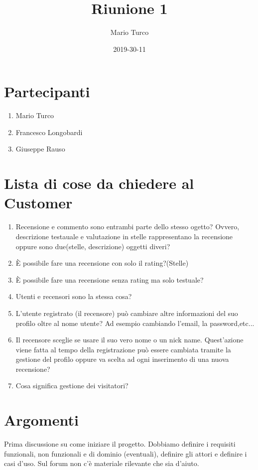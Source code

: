\documentclass{article}
\title{Riunione 1}
\date{2019-30-11}
\author{Mario Turco}
\begin{document}
\maketitle
{}
\newpage
{}
\section{Partecipanti}
\begin{enumerate}
    \item Mario Turco
    \item Francesco Longobardi  
    \item Giuseppe Rauso
\end{enumerate}
\section{Lista di cose da chiedere al Customer}
\begin{enumerate}
    \item Recensione e commento sono entrambi parte dello stesso ogetto? Ovvero, descrizione testauale e valutazione in stelle rappresentano la recensione oppure sono due(stelle, descrizione) oggetti diveri?
    \item È possibile fare una recensione con solo il rating?(Stelle)
    \item È possibile fare una recensione senza rating ma solo testuale?
    \item Utenti e recensori sono la stessa cosa?
    \item L'utente registrato (il recensore) può cambiare altre informazioni del suo profilo oltre al nome utente? Ad esempio cambiando l'email, la password,etc...
    \item Il recensore sceglie se usare il suo vero nome o un nick name. Quest'azione viene fatta al tempo della registrazione può essere cambiata tramite la gestione del profilo oppure va scelta ad ogni inserimento di una nuova recensione?
    \item Cosa significa gestione dei visitatori?
\end{enumerate}
\newpage
\section{Argomenti}
Prima discussione su come iniziare il progetto.
Dobbiamo definire i requisiti funzionali, non funzionali e di dominio (eventuali), definire gli attori e definire i casi d'uso.
Sul forum non c'è materiale rilevante che sia d'aiuto.
\end{document}
